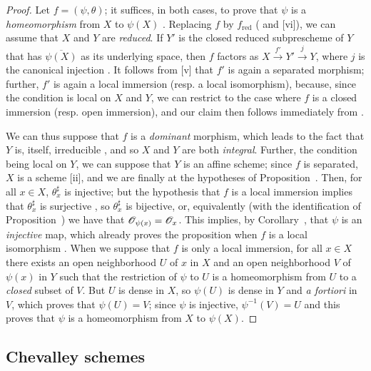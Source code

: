 \begin{proof}
\label{proof-1.8.2.8}
Let $f=(\psi,\theta)$;
it suffices, in both cases, to prove that $\psi$ is a \emph{homeomorphism} from $X$ to $\psi(X)$ .
Replacing $f$ by $f_\text{red}$ ( and [vi]), we can assume that $X$ and $Y$ are \emph{reduced}.
If $Y'$ is the closed reduced subprescheme of $Y$ that has $\overline{\psi(X)}$ as its underlying space, then $f$ factors as $X\xrightarrow{f'}Y'\xrightarrow{j}Y$, where $j$ is the canonical injection .
It follows from [v] that $f'$ is again a separated morphism; further, $f'$ is again
a local immersion (resp. a local isomorphism), because, since the condition is local on $X$ and $Y$, we can restrict to the case where $f$ is a closed immersion (resp. open immersion), and our claim then follows immediately from .

We can thus suppose that $f$ is a \emph{dominant} morphism, which leads to the fact that $Y$ is, itself, irreducible , and so $X$ and $Y$ are both \emph{integral}.
Further, the condition being local on $Y$, we can suppose that $Y$ is an affine scheme;
since $f$ is separated, $X$ is a scheme [ii], and we are finally at the hypotheses of Proposition~.
Then, for all $x\in X$, $\theta_x^\sharp$ is injective;
but the hypothesis that $f$ is a local immersion implies that $\theta_x^\sharp$ is surjective , so $\theta_x^\sharp$ is bijective, or, equivalently (with the identification of Proposition~) we have that $\mathscr{O}_{\psi(x)}=\mathscr{O}_x$.
This implies, by Corollary~, that $\psi$ is an \emph{injective} map, which already proves the proposition when $f$ is a local isomorphism .
When we suppose that $f$ is only a local immersion, for all $x\in X$ there exists an open neighborhood $U$ of $x$ in $X$ and an open neighborhood $V$ of $\psi(x)$ in $Y$ such that the restriction of $\psi$ to $U$ is a homeomorphism from $U$ to a \emph{closed} subset of $V$.
But $U$ is dense in $X$, so $\psi(U)$ is dense in $Y$ and \emph{a fortiori} in $V$, which proves that $\psi(U)=V$;
since $\psi$ is injective, $\psi^{-1}(V)=U$ and this proves that $\psi$ is a homeomorphism from $X$ to $\psi(X)$.
\end{proof}

\subsection{Chevalley schemes}
\label{subsection-chevalley-schemes}

